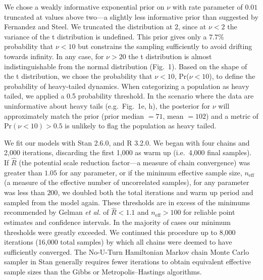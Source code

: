\documentclass[12pt]{article}
\begin{document}
We chose a weakly informative exponential prior on \(\nu\) with rate parameter of \(0.01\) truncated at values above two---a slightly less informative prior than suggested by Fernandez and Steel\cite{fernandez1998}. We truncated the distribution at \(2\), since at \(\nu < 2\) the variance of the t distribution is undefined. This prior gives only a \(7.7\)\% probability that \(\nu < 10\) but constrains the sampling sufficiently to avoid drifting towards infinity. In any case, for \(\nu > 20\) the t distribution is almost indistinguishable from the normal distribution (Fig.~1). Based on the shape of the t distribution, we chose the probability that \(\nu < 10\), Pr(\(\nu < 10\)), to define the probability of heavy-tailed dynamics. When categorizing a population as heavy tailed, we applied a 0.5 probability threshold. In the scenario where the data are uninformative about heavy tails (e.g.~Fig.~1e, h), the posterior for \(\nu\) will approximately match the prior (prior median \(= 71\), mean \(= 102\)) and a metric of Pr\((\nu < 10) > 0.5\) is unlikely to flag the population as heavy tailed.

We fit our models with Stan 2.6.0\cite{stan-manual2015, hoffman2014}, and R 3.2.0\cite{r2015}. We began with four chains and 2,000 iterations, discarding the first 1,000 as warm up (i.e.~4,000 final samples). If \(\hat{R}\) (the potential scale reduction factor---a measure of chain convergence) was greater than \(1.05\) for any parameter, or if the minimum effective sample size, \(n_\mathrm{eff}\) (a measure of the effective number of uncorrelated samples), for any parameter was less than \(200\), we doubled both the total iterations and warm up period and sampled from the model again. These thresholds are in excess of the minimums recommended by Gelman \emph{et al.}\cite{gelman2006a} of \(\hat{R} < 1.1\) and \(n_\mathrm{eff} > 100\) for reliable point estimates and confidence intervals. In the majority of cases our minimum thresholds were greatly exceeded. We continued this procedure up to 8,000 iterations (16,000 total samples) by which all chains were deemed to have sufficiently converged. The No-U-Turn Hamiltonian Markov chain Monte Carlo sampler in Stan generally requires fewer iterations to obtain equivalent effective sample sizes than the Gibbs or Metropolis--Hastings algorithms\cite{stan-manual2015}.
\end{document}

